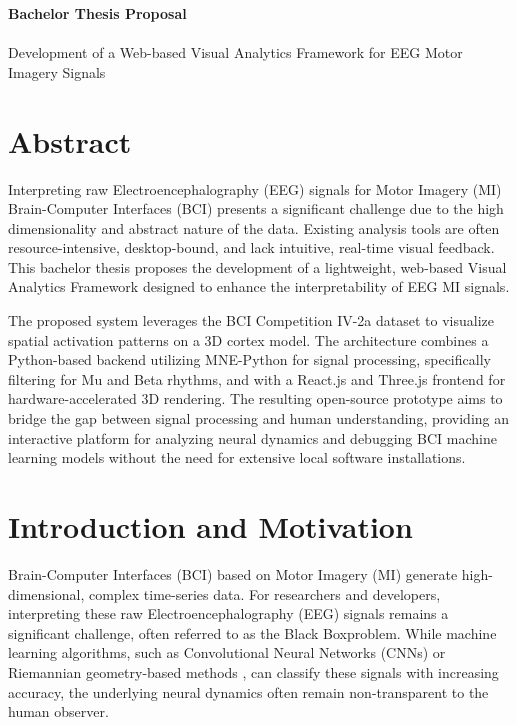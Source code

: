 


\begin{titlepage}
\vspace*{\fill}
\begingroup
\centering
{\Huge\textbf{Bachelor Thesis Proposal}}\\[0.5cm]
{\large }\\[0.5cm]
{\large Development of a Web-based Visual Analytics Framework for EEG Motor Imagery Signals}

\endgroup
\vspace*{\fill}
\end{titlepage}
\setcounter{page}{1} %


\section*{Abstract}
Interpreting raw Electroencephalography (EEG) signals for Motor Imagery (MI) Brain-Computer Interfaces (BCI) presents a significant challenge due to the high dimensionality and abstract nature of the data. Existing analysis tools are often resource-intensive, desktop-bound, and lack intuitive, real-time visual feedback. This bachelor thesis proposes the development of a lightweight, web-based Visual Analytics Framework designed to enhance the interpretability of EEG MI signals.

The proposed system leverages the BCI Competition IV-2a dataset to visualize spatial activation patterns on a 3D cortex model. The architecture combines a Python-based backend utilizing MNE-Python for signal processing, specifically filtering for Mu and Beta rhythms, and with a React.js and Three.js frontend for hardware-accelerated 3D rendering. The resulting open-source prototype aims to bridge the gap between signal processing and human understanding, providing an interactive platform for analyzing neural dynamics and debugging BCI machine learning models without the need for extensive local software installations.

\clearpage

\tableofcontents
\clearpage

\section{Introduction and Motivation}
Brain-Computer Interfaces (BCI) based on Motor Imagery (MI) generate high-dimensional, complex time-series data. For researchers and developers, interpreting these raw Electroencephalography (EEG) signals remains a significant challenge, often referred to as the \glqq Black Box\grqq \space problem. While machine learning algorithms, such as Convolutional Neural Networks (CNNs) \cite{srimadumathi2024} or Riemannian geometry-based methods \cite{barachant2012}, can classify these signals with increasing accuracy, the underlying neural dynamics often remain non-transparent to the human observer.

